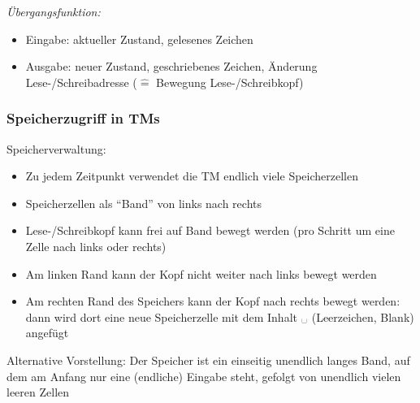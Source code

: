 \documentclass[aspectratio=1610,onlymath]{beamer}
\begin{document}
\begin{frame}
\emph{Übergangsfunktion:}
\begin{itemize}
\item \alert{Eingabe:} aktueller Zustand, gelesenes Zeichen
\item \alert{Ausgabe:} neuer Zustand, geschriebenes Zeichen, Änderung Lese-/Schreibadresse (${}\hat{=}{}$ Bewegung Lese-/Schreibkopf)
\end{itemize}

\end{frame}

\begin{frame}\frametitle{Speicherzugriff in TMs}


\alert{Speicherverwaltung:}
\begin{itemize}
\item Zu jedem Zeitpunkt verwendet die TM endlich viele Speicherzellen
\item Speicherzellen als "`Band"' von links nach rechts
\item Lese-/Schreibkopf kann frei auf Band bewegt werden (pro Schritt um eine Zelle nach links oder rechts)
\item Am linken Rand kann der Kopf nicht weiter nach links bewegt werden
\item Am rechten Rand des Speichers kann der Kopf nach rechts bewegt werden: dann wird dort eine neue Speicherzelle mit dem Inhalt $\blank$ (Leerzeichen, Blank) angefügt
\end{itemize}\bigskip

\alert{Alternative Vorstellung:} Der Speicher ist ein einseitig unendlich langes Band, auf dem am Anfang nur
eine (endliche) Eingabe steht, gefolgt von unendlich vielen leeren Zellen 


\end{frame}

\begin{frame}


\end{frame}
\end{document}
